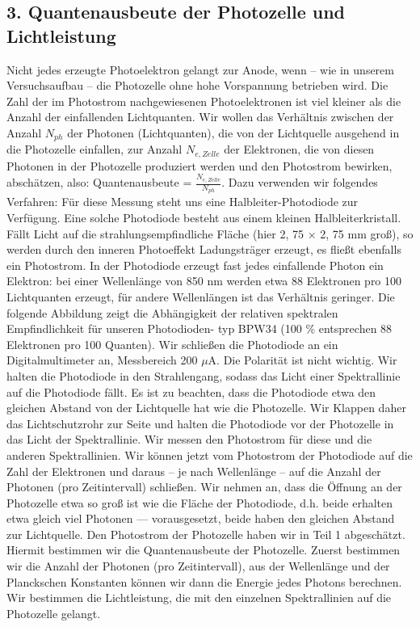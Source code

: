 \documentclass[12px]{scrartcl}
\begin{document}
\subsection{3. Quantenausbeute der Photozelle und Lichtleistung}
Nicht jedes erzeugte Photoelektron gelangt zur Anode, wenn -- wie in unserem Versuchsaufbau -- die
Photozelle ohne hohe Vorspannung betrieben wird. Die Zahl der im Photostrom nachgewiesenen Photoelektronen ist viel kleiner als die Anzahl der einfallenden Lichtquanten. %
Wir wollen das Verhältnis zwischen der Anzahl $N_{ph}$ der Photonen (Lichtquanten), die von der Lichtquelle ausgehend in die Photozelle einfallen, zur
Anzahl $N_{e,Zelle}$ der Elektronen, die von diesen Photonen in der Photozelle produziert werden und den Photostrom bewirken, abschätzen, also: Quantenausbeute = $\frac{N_{e,Zelle}}{N_{ph}}$.
Dazu verwenden wir folgendes Verfahren: Für diese Messung steht uns eine Halbleiter-Photodiode zur Verfügung. Eine solche Photodiode besteht aus einem kleinen Halbleiterkristall. Fällt Licht auf die strahlungsempfindliche Fläche (hier 2, 75 $\times$ 2, 75 mm groß), so werden durch den inneren Photoeffekt Ladungsträger erzeugt, es fließt ebenfalls ein Photostrom. In der Photodiode erzeugt fast jedes einfallende Photon ein Elektron: bei einer Wellenlänge von 850 nm werden
etwa 88 Elektronen pro 100 Lichtquanten erzeugt, für andere Wellenlängen ist das Verhältnis geringer.
Die folgende Abbildung zeigt die Abhängigkeit der relativen spektralen Empfindlichkeit für unseren Photodioden-
typ BPW34 (100 \% entsprechen 88 Elektronen pro 100 Quanten).
Wir schließen die Photodiode an ein Digitalmultimeter an, Messbereich 200 $\mu$A. Die Polarität ist nicht wichtig. Wir halten die Photodiode in den Strahlengang, sodass das Licht einer Spektrallinie auf die Photodiode fällt. Es ist zu beachten, dass die Photodiode etwa den gleichen Abstand von der Lichtquelle hat wie die Photozelle.
Wir Klappen daher das Lichtschutzrohr zur Seite
und halten die Photodiode vor der Photozelle in das Licht der Spektrallinie.
Wir messen den Photostrom für diese und die anderen Spektrallinien.
Wir können jetzt vom Photostrom der Photodiode auf die Zahl der Elektronen und daraus -- je nach Wellenlänge -- auf die Anzahl der Photonen (pro Zeitintervall) schließen. Wir nehmen an, dass die Öffnung an der Photozelle etwa so groß ist wie die Fläche der Photodiode, d.h. beide erhalten etwa gleich viel Photonen — vorausgesetzt, beide haben den gleichen Abstand zur Lichtquelle. Den Photostrom der Photozelle haben wir in Teil 1 abgeschätzt. Hiermit bestimmen wir die Quantenausbeute der Photozelle. Zuerst bestimmen wir die Anzahl der Photonen (pro Zeitintervall), aus der Wellenlänge und der Planckschen Konstanten können wir dann die Energie jedes Photons berechnen. Wir bestimmen die Lichtleistung, die mit den einzelnen Spektrallinien auf die Photozelle gelangt.
\end{document}
